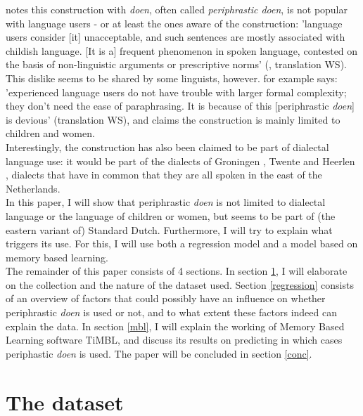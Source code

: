 \documentclass[12pt]{article}
\begin{document}
\citet{g83} notes this construction with \emph{doen}, often called \emph{periphrastic doen}, is not popular with language users - or at least the ones aware of the construction: 'language users consider [it] unacceptable, and such sentences are mostly associated with childish language. [It is a] frequent phenomenon in spoken language, contested on the basis of non-linguistic arguments or prescriptive norms' (\citealp[p. 58]{g83}, translation WS).\\\indent
This dislike seems to be shared by some linguists, however. \citet[p. 121]{d94} for example says: 'experienced language users do not have trouble with larger formal complexity; they don't need the ease of paraphrasing. It is because of this [periphrastic \emph{doen}] is devious' (translation WS), and \citet[p. 153]{n62} claims the construction is mainly limited to children and women.\\\indent
Interestingly, the construction has also been claimed to be part of dialectal language use: it would be part of the dialects of Groningen \citep{tl53}, Twente \citep{n62} and Heerlen \citep{c94}, dialects that have in common that they are all spoken in the east of the Netherlands.\\\indent
In this paper, I will show that periphrastic \emph{doen} is not limited to dialectal language or the language of children or women,  but seems to be part of (the eastern variant of) Standard Dutch. Furthermore, I will try to explain what triggers its use. For this, I will use both a regression model and a model based on memory based learning.\\\indent
The remainder of this paper consists of 4 sections. In section \ref{data}, I will elaborate on the collection and the nature of the dataset used. Section \ref{regression} consists of an overview of factors that could possibly have an influence on whether periphrastic \emph{doen} is used or not, and to what extent these factors indeed can explain the data. In section \ref{mbl}, I will explain the working of Memory Based Learning software TiMBL, and discuss its results on predicting in which cases periphastic \emph{doen} is used. The paper will be concluded in section \ref{conc}.



\section{The dataset} \label{data}
\end{document}
